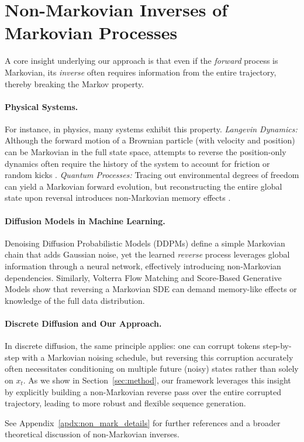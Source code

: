 \section{Non-Markovian Inverses of Markovian Processes}
\label{sec:non-markovian-inverse}

A core insight underlying our approach is that even if the \emph{forward} process is Markovian, its \emph{inverse} often requires information from the entire trajectory, thereby breaking the Markov property.
\paragraph{Physical Systems.}
For instance, in physics, many systems exhibit this property. \textit{Langevin Dynamics:} Although the forward motion of a Brownian particle (with velocity and position) can be Markovian in the full state space, attempts to reverse the position-only dynamics often require the history of the system to account for friction or random kicks \citep{gardiner2009stochastic, vankampen1992stochastic}. \textit{Quantum Processes:} Tracing out environmental degrees of freedom can yield a Markovian forward evolution, but reconstructing the entire global state upon reversal introduces non-Markovian memory effects \citep{Rivas_2014}.

\paragraph{Diffusion Models in Machine Learning.}
Denoising Diffusion Probabilistic Models (DDPMs) \citep{ho2020denoisingdiffusionprobabilisticmodels} define a simple Markovian chain that adds Gaussian noise, yet the learned \emph{reverse} process leverages global information through a neural network, effectively introducing non-Markovian dependencies. Similarly, Volterra Flow Matching \citep{he2024calmflowvolterraflowmatching} and Score-Based Generative Models \citep{song2021scorebasedgenerativemodelingstochastic} show that reversing a Markovian SDE can demand memory-like effects or knowledge of the full data distribution.

\paragraph{Discrete Diffusion and Our Approach.}
In discrete diffusion, the same principle applies: one can corrupt tokens step-by-step with a Markovian noising schedule, but reversing this corruption accurately often necessitates conditioning on multiple future (noisy) states rather than solely on $x_t$. As we show in Section~\ref{sec:method}, our \method{} framework leverages this insight by explicitly building a non-Markovian reverse pass over the entire corrupted trajectory, leading to more robust and flexible sequence generation.

See Appendix~\ref{apdx:non_mark_details} for further references and a broader theoretical discussion of non-Markovian inverses.


